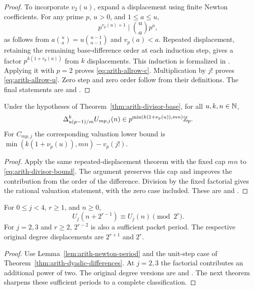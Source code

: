 \begin{proof}
To incorporate $v_2(u)$, expand a displacement using finite Newton
coefficients.  For any prime $p$, $u>0$, and $1\le a\le u$,
\[
 p^{v_p(u)+1}\mid\binom ua p^a,
\]
as follows from $a\binom ua=u\binom{u-1}{a-1}$ and $v_p(a)<a$.
Repeated displacement, retaining the remaining base-difference order
at each induction step, gives a factor $p^{k(1+v_p(u))}$ from $k$
displacements.  This induction is formalized in
.
Applying it with $p=2$ proves \eqref{eq:arith-allrow-c}. Multiplication
by $j!$ proves \eqref{eq:arith-allrow-u}.  Zero step and zero order follow
from their definitions.  The final statements are
and
.
\end{proof}

\begin{corollary}\label{cor:arith-amplified}
Under the hypotheses of Theorem~\ref{thm:arith-divisor-base}, for all
$u,k,n\in\mathbb N$,
\[
 \Delta_{u(p-1)/m}^{k}U_{mp,j}(n)
       \in p^{\min(k(1+\nu_p(u)),mn)}\mathbb Z_p.
\]
For $C_{mp,j}$ the corresponding valuation lower bound is
$\min(k(1+\nu_p(u)),mn)-v_p(j!)$.
\end{corollary}

\begin{proof}
Apply the same repeated-displacement theorem with the fixed cap $mn$ to
\eqref{eq:arith-divisor-bound}.  The argument preserves this cap and
improves the contribution from the order of the difference.
Division by the fixed factorial gives the rational valuation statement,
with the zero case included.
These are
and
.
\end{proof}

\begin{corollary}\label{cor:arith-allrow-period}
For $0\le j<4$, $r\ge1$, and $n\ge0$,
\[
 U_j(n+2^{r-1})\equiv U_j(n)\pmod{2^r}.
\]
For $j=2,3$ and $r\ge2$, $2^{r-2}$ is also a sufficient packet period.
The respective original degree displacements are $2^{r+1}$ and $2^r$.
\end{corollary}

\begin{proof}
Use Lemma~\ref{lem:arith-newton-period} and the unit-step case of
Theorem~\ref{thm:arith-dyadic-differences}.  At $j=2,3$ the factorial
contributes an additional power of two.  The original degree versions are
and
.
The next theorem sharpens these sufficient periods to a complete
classification.
\end{proof}

